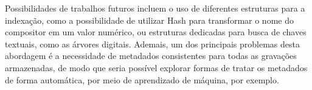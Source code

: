 \documentclass[12pt]{article}
\begin{document}
Possibilidades de trabalhos futuros incluem o uso de diferentes estruturas para
a indexação, como a possibilidade de utilizar Hash para transformar o nome do
compositor em um valor numérico, ou estruturas dedicadas para busca de chaves
textuais, como as árvores digitais.
Ademais, um dos principais problemas desta abordagem é a necessidade de metadados
consistentes para todas as gravações armazenadas, de modo que seria possível
explorar formas de tratar os metadados de forma automática, por meio de
aprendizado de máquina, por exemplo.




\end{document}

